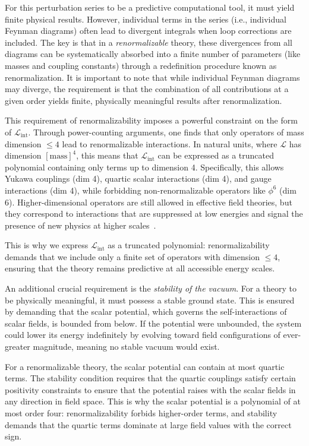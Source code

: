 For this perturbation series to be a predictive computational tool, it must yield finite physical results. However, individual terms in the series (i.e., individual Feynman diagrams) often lead to divergent integrals when loop corrections are included. The key is that in a \textit{renormalizable} theory, these divergences from all diagrams can be systematically absorbed into a finite number of parameters (like masses and coupling constants) through a redefinition procedure known as renormalization. It is important to note that while individual Feynman diagrams may diverge, the requirement is that the combination of all contributions at a given order yields finite, physically meaningful results after renormalization.

This requirement of renormalizability imposes a powerful constraint on the form of $\mathcal{L}_{\text{int}}$. Through power-counting arguments, one finds that only operators of mass dimension $\leq 4$ lead to renormalizable interactions. In natural units, where $\mathcal{L}$ has dimension $[\text{mass}]^4$, this means that $\mathcal{L}_{\text{int}}$ can be expressed as a truncated polynomial containing only terms up to dimension 4. Specifically, this allows Yukawa couplings (dim 4), quartic scalar interactions (dim 4), and gauge interactions (dim 4), while forbidding non-renormalizable operators like $\phi^6$ (dim 6). Higher-dimensional operators are still allowed in effective field theories, but they correspond to interactions that are suppressed at low energies and signal the presence of new physics at higher scales~\parencite{peskin,Weinberg}.

This is why we express $\mathcal{L}_{\text{int}}$ as a truncated polynomial: renormalizability demands that we include only a finite set of operators with dimension $\leq 4$, ensuring that the theory remains predictive at all accessible energy scales.

An additional crucial requirement is the \textit{stability of the vacuum}. For a theory to be physically meaningful, it must possess a stable ground state. This is ensured by demanding that the scalar potential, which governs the self-interactions of scalar fields, is bounded from below. If the potential were unbounded, the system could lower its energy indefinitely by evolving toward field configurations of ever-greater magnitude, meaning no stable vacuum would exist.

For a renormalizable theory, the scalar potential can contain at most quartic terms.  The stability condition requires that the quartic couplings satisfy certain positivity constraints to ensure that the potential raises with the scalar fields in any direction in field space. This is why the scalar potential is a polynomial of at most order four: renormalizability forbids higher-order terms, and stability demands that the quartic terms dominate at large field values with the correct sign.

